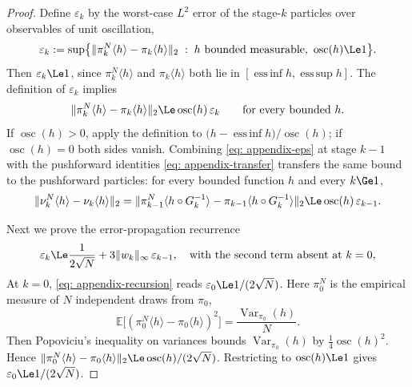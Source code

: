 \documentclass{article}
\begin{document}
\begin{proof}
Define $\varepsilon_k$ by the worst-case $L^2$ error of the stage-$k$ particles over observables of unit oscillation,
\begin{equation}
    \varepsilon_k := \sup\bigl\{\lVert\pi_k^N\langle h\rangle-\pi_k\langle h\rangle\rVert_2
    \;:\; h\text{ bounded measurable},\ \operatorname{osc}(h)\Le1\bigr\} .
    \label{eq: appendix-eps-def}
\end{equation}
Then $\varepsilon_k\Le1$, since $\pi_k^N\langle h\rangle$ and $\pi_k\langle h\rangle$ both lie in $[\operatorname{ess\,inf}h,\operatorname{ess\,sup}h]$. The definition of $\varepsilon_k$ implies
\begin{equation}
    \lVert\pi_k^N\langle h\rangle-\pi_k\langle h\rangle\rVert_2 \Le \operatorname{osc}(h)\,\varepsilon_k
    \qquad\text{for every bounded } h.
    \label{eq: appendix-eps}
\end{equation}
If $\operatorname{osc}(h)>0$, apply the definition to $\bigl(h-\operatorname{ess\,inf}h\bigr)/\operatorname{osc}(h)$; if $\operatorname{osc}(h)=0$ both sides vanish.
Combining \eqref{eq: appendix-eps} at stage $k-1$ with the pushforward identities \eqref{eq: appendix-transfer} transfers the same bound to the pushforward particles: for every bounded function $h$ and every $k\Ge1$,
\begin{equation}
    \lVert\nu_k^N\langle h\rangle-\nu_k\langle h\rangle\rVert_2
    = \lVert\pi_{k-1}^N\langle h\circ G_k^{-1}\rangle-\pi_{k-1}\langle h\circ G_k^{-1}\rangle\rVert_2
    \Le \operatorname{osc}(h)\,\varepsilon_{k-1} .
    \label{eq: appendix-transferred}
\end{equation}

Next we prove the error-propagation recurrence
\begin{equation}
    \varepsilon_k \Le \frac{1}{2\sqrt N} + 3\lVert w_k\rVert_\infty\,\varepsilon_{k-1},
    \quad\text{with the second term absent at } k=0,
    \label{eq: appendix-recursion}
\end{equation}
At $k=0$, \eqref{eq: appendix-recursion} reads $\varepsilon_0\Le1/(2\sqrt N)$. Here $\pi_0^N$ is the empirical measure of $N$ independent draws from $\pi_0$,
\begin{equation*}
    \mathbb E\bigl[(\pi_0^N\langle h\rangle-\pi_0\langle h\rangle)^{2}\bigr]
    = \frac{\operatorname{Var}_{\pi_0}(h)}{N} .
\end{equation*}
Then Popoviciu's inequality on variances \citep{popoviciu1935equations} bounds $\operatorname{Var}_{\pi_0}(h)$ by $\frac14\operatorname{osc}(h)^2$. Hence $\lVert\pi_0^N\langle h\rangle-\pi_0\langle h\rangle\rVert_2 \Le \operatorname{osc}(h)/(2\sqrt N)$. Restricting to $\operatorname{osc}(h)\Le1$ gives $\varepsilon_0\Le 1/(2\sqrt N)$.


\end{proof}
\end{document}
